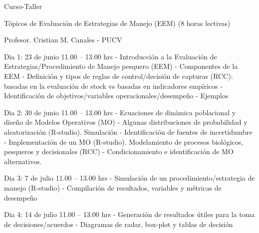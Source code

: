 Curso-Taller

Tópicos de Evaluación de Estrategias de Manejo (EEM) (8 horas lectivas)

Profesor.  Cristian M. Canales - PUCV

Dia 1: 23 de junio 11.00 – 13.00 hrs
- Introducción a la Evaluación de Estrategias/Procedimiento de Manejo pesquero (EEM)
- Componentes de la EEM
- Definición y tipos de reglas de control/decisión de capturas (RCC): basadas en la evaluación de stock vs basadas en indicadores empíricos
- Identificación de objetivos/variables operacionales/desempeño
- Ejemplos

Dia 2: 30 de junio 11.00 – 13.00 hrs
- Ecuaciones de dinámica poblacional y diseño de Modelos Operativos (MO)
- Algunas distribuciones de probabilidad y aleatorización (R-studio). Simulación
- Identificación de fuentes de incertidumbre
- Implementación de un MO (R-studio). Modelamiento de procesos biológicos, pesqueros y decisionales (RCC)
- Condicionamiento e identificación de MO alternativos.

Dia 3: 7 de julio 11.00 – 13.00 hrs
- Simulación de un procedimiento/estrategia de manejo (R-studio)
- Compilación de resultados, variables y métricas de desempeño

Dia 4: 14 de julio 11.00 – 13.00 hrs
- Generación de resultados útiles para la toma de decisiones/acuerdos
- Diagramas de radar, box-plot y tablas de decisión

